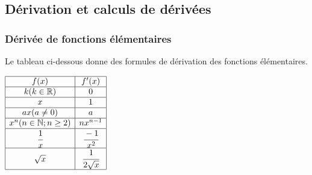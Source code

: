 \documentclass[a4paper, 12pt]{report}
\begin{document}
            \subsection{Dérivation et calculs de dérivées}
                \subsubsection{Dérivée de fonctions élémentaires}
                    Le tableau ci-dessous donne des formules de dérivation des fonctions élémentaires.
                        \begin{center}
                            $\begin{array}{|c|c|}
                                \hline
                                        f(x)        &     f'(x) \\ \hline
                                k (k\in\mathbb{R})  &      0    \\ \hline
                                        x           &       1   \\ \hline
                                    ax(a\neq 0)     &       a   \\ \hline
                        x^n(n\in\mathbb{N};n\geq 2) &   nx^{n-1}\\ \hline
                                \cfrac{1}{x}        & \cfrac{-1}{x^2}\\ \hline
                                \sqrt{x}            & \cfrac{1}{2\sqrt{x}}\\ \hline
                            \end{array}$
                        \end{center}
\end{document}

